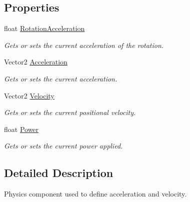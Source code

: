\subsection*{Properties}
\begin{DoxyCompactItemize}
\item 
float \hyperlink{class_m_b2_d_1_1_entity_component_1_1_physics_component_a835ff0d9866e993bfe7991bd91b2354c}{Rotation\+Acceleration}
\begin{DoxyCompactList}\small\item\em Gets or sets the current acceleration of the rotation. \end{DoxyCompactList}\item 
Vector2 \hyperlink{class_m_b2_d_1_1_entity_component_1_1_physics_component_a8a96d7392f96b702168ec3d9a348fd62}{Acceleration}
\begin{DoxyCompactList}\small\item\em Gets or sets the current acceleration. \end{DoxyCompactList}\item 
Vector2 \hyperlink{class_m_b2_d_1_1_entity_component_1_1_physics_component_a67477d82a7e9555cb9d08351c8ffe24f}{Velocity}
\begin{DoxyCompactList}\small\item\em Gets or sets the current positional velocity. \end{DoxyCompactList}\item 
float \hyperlink{class_m_b2_d_1_1_entity_component_1_1_physics_component_ac97c10e8e2bc12040b80d6d62b4c783f}{Power}
\begin{DoxyCompactList}\small\item\em Gets or sets the current power applied. \end{DoxyCompactList}\end{DoxyCompactItemize}


\subsection{Detailed Description}
Physics component used to define acceleration and velocity. 



